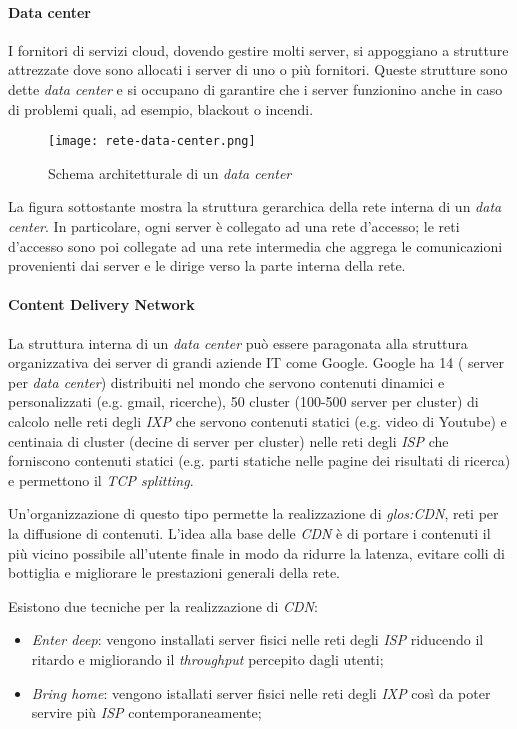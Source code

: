 \paragraph{Data center}
I fornitori di servizi cloud, dovendo gestire molti server, si appoggiano a
strutture attrezzate dove sono allocati i server di uno o più fornitori. Queste
strutture sono dette \emph{data center} e si occupano di garantire che i server
funzionino anche in caso di problemi quali, ad esempio, blackout o incendi.

\begin{figure}[ht]
    \centering
    \texttt{[image: rete-data-center.png]}
    \caption{Schema architetturale di un \emph{data center}}
\end{figure}
La figura sottostante mostra la struttura gerarchica della rete interna di un
\emph{data center}. In particolare, ogni server è collegato ad una rete
d'accesso; le reti d'accesso sono poi collegate ad una rete intermedia che aggrega
le comunicazioni provenienti dai server e le dirige verso la parte interna della
rete.

\paragraph{Content Delivery Network}
La struttura interna di un \emph{data center} può essere paragonata alla
struttura organizzativa dei server di grandi aziende IT come Google. Google ha 14
\emph{} ( server per \emph{data center})
distribuiti nel mondo che servono contenuti dinamici e personalizzati (e.g. gmail,
ricerche), 50 cluster (100-500 server per cluster) di calcolo
\emph{} nelle reti degli \emph{IXP} che servono contenuti
statici (e.g. video di Youtube) e centinaia di cluster (decine di server per cluster)
\emph{} nelle reti degli \emph{ISP} che forniscono contenuti
statici (e.g. parti statiche nelle pagine dei risultati di ricerca) e permettono
il \emph{TCP splitting}.

Un'organizzazione di questo tipo permette la realizzazione di \emph{\gls{glos:CDN}},
reti \emph{} per la diffusione di contenuti. L'idea alla base
delle \emph{CDN} è di portare i contenuti il più vicino possibile all'utente
finale in modo da ridurre la latenza, evitare colli di bottiglia e migliorare le
prestazioni generali della rete.

Esistono due tecniche per la realizzazione di \emph{CDN}:
\begin{itemize}
    \item \emph{Enter deep}: vengono installati server fisici nelle reti degli
    \emph{ISP} riducendo il ritardo e migliorando il \emph{throughput} percepito
    dagli utenti;
    \item \emph{Bring home}: vengono istallati server fisici nelle reti degli
    \emph{IXP} così da poter servire più \emph{ISP} contemporaneamente;
\end{itemize}

